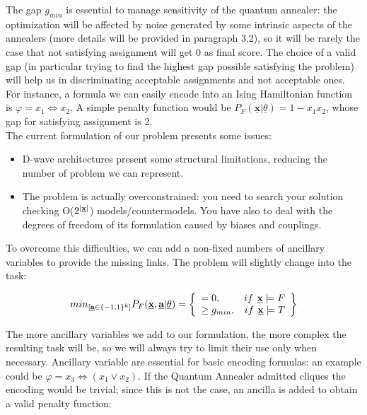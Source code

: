 The gap $g_{min}$ is essential to manage sensitivity of the quantum annealer: the optimization will be affected by noise generated by some intrinsic aspects of the annealers (more details will be provided in paragraph 3.2), so it will be rarely the case that not satisfying assignment will get 0 as final score. The choice of a valid gap (in particular trying to find the highest gap possible satisfying the problem) will help us in discriminating acceptable assignments and not acceptable ones.
For instance, a formula we can easily encode into an Ising Hamiltonian function is $\varphi = x_1 \iff x_2$. A simple penalty function would be $P_F(\underline{\textbf{x}} | \underline{\theta}) = 1 - x_1x_2$, whose gap for satisfying assignment is 2. \\
The current formulation of our problem presents some issues:

\begin{itemize}
    \item D-wave architectures present some structural limitations, reducing the number of problem we can represent.
    \item The problem is actually overconstrained: you need to search your solution checking O($2^{|\textbf{\underline{x}}|}$) models/countermodels. You have also to deal with the degrees of freedom of its formulation caused by biases and couplings.
\end{itemize}

To overcome this difficulties, we can add a non-fixed numbers of ancillary variables to provide the missing links. The problem will slightly change into the task:

\begin{equation}
    min_{[\textbf{\underline{a}} \in \{-1,1\}^k]} P_F(\underline{\textbf{x}},\underline{\textbf{a}} | \underline{\theta}) = 
    \left\{
        \begin{array}{lr}
            = 0, & if \textbf{ \underline{x}} \models F \\
            \geq g_{min}, & if \textbf{ \underline{x}} \models T
        \end{array}
    \right\}
\end{equation}

The more ancillary variables we add to our formulation, the more complex the resulting task will be, so we will always try to limit their use only when necessary. Ancillary variable are essential for basic encoding formulas: an example could be $\varphi = x_3 \iff (x_1 \vee x_2)$. If the Quantum Annealer admitted cliques the encoding would be trivial; since this is not the case, an ancilla is added to obtain a valid penalty function:

